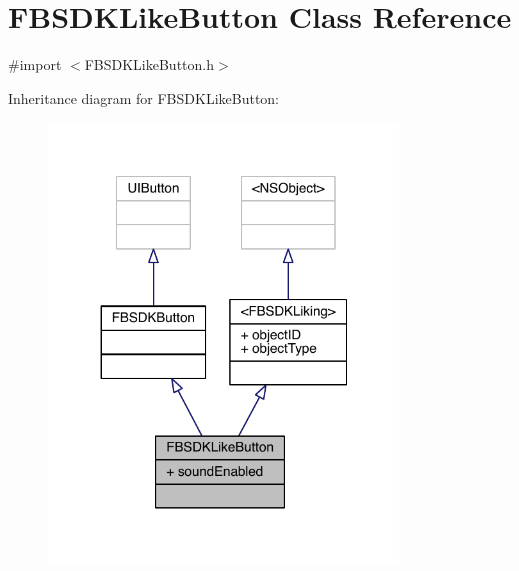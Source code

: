 \hypertarget{interface_f_b_s_d_k_like_button}{\section{F\-B\-S\-D\-K\-Like\-Button Class Reference}
\label{interface_f_b_s_d_k_like_button}
}


{\ttfamily \#import $<$F\-B\-S\-D\-K\-Like\-Button.\-h$>$}



Inheritance diagram for F\-B\-S\-D\-K\-Like\-Button\-:
\nopagebreak
\begin{figure}[H]
\begin{center}
\leavevmode
\includegraphics[width=263pt]{interface_f_b_s_d_k_like_button__inherit__graph}
\end{center}
\end{figure}


